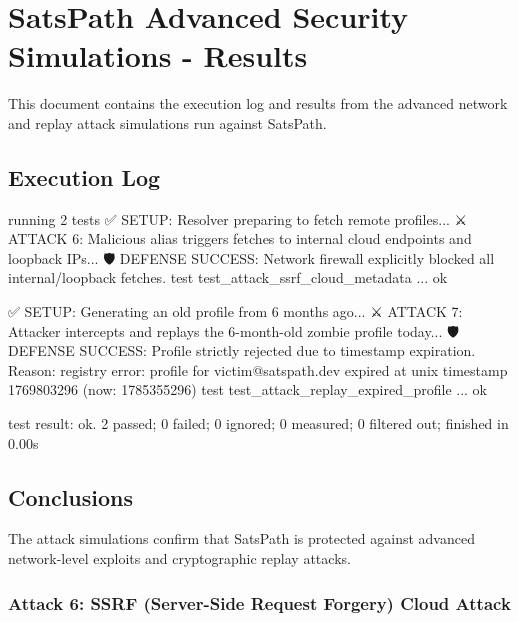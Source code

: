 \documentclass[
]{article}
\newenvironment{Shaded}{}{}
\newcommand{\NormalTok}[1]{#1}
\begin{document}
\hypertarget{satspath-advanced-security-simulations---results}{%
\section{SatsPath Advanced Security Simulations -
Results}\label{satspath-advanced-security-simulations---results}}

This document contains the execution log and results from the advanced
network and replay attack simulations run against SatsPath.

\hypertarget{execution-log-2}{%
\subsection{Execution Log}\label{execution-log-2}}

\begin{Shaded}
\begin{Highlighting}[]
\NormalTok{running 2 tests}
\NormalTok{✅ SETUP: Resolver preparing to fetch remote profiles...}
\NormalTok{⚔️ ATTACK 6: Malicious alias triggers fetches to internal cloud endpoints and loopback IPs...}
\NormalTok{🛡️ DEFENSE SUCCESS: Network firewall explicitly blocked all internal/loopback fetches.}
\NormalTok{test test\_attack\_ssrf\_cloud\_metadata ... ok}

\NormalTok{✅ SETUP: Generating an old profile from 6 months ago...}
\NormalTok{⚔️ ATTACK 7: Attacker intercepts and replays the 6{-}month{-}old zombie profile today...}
\NormalTok{🛡️ DEFENSE SUCCESS: Profile strictly rejected due to timestamp expiration. Reason: registry error: profile for \textquotesingle{}victim@satspath.dev\textquotesingle{} expired at unix timestamp 1769803296 (now: 1785355296)}
\NormalTok{test test\_attack\_replay\_expired\_profile ... ok}

\NormalTok{test result: ok. 2 passed; 0 failed; 0 ignored; 0 measured; 0 filtered out; finished in 0.00s}
\end{Highlighting}
\end{Shaded}

\hypertarget{conclusions-2}{%
\subsection{Conclusions}\label{conclusions-2}}

The attack simulations confirm that SatsPath is protected against
advanced network-level exploits and cryptographic replay attacks.

\hypertarget{attack-6-ssrf-server-side-request-forgery-cloud-attack}{%
\subsubsection{Attack 6: SSRF (Server-Side Request Forgery) Cloud
Attack}\label{attack-6-ssrf-server-side-request-forgery-cloud-attack}}
\end{document}
